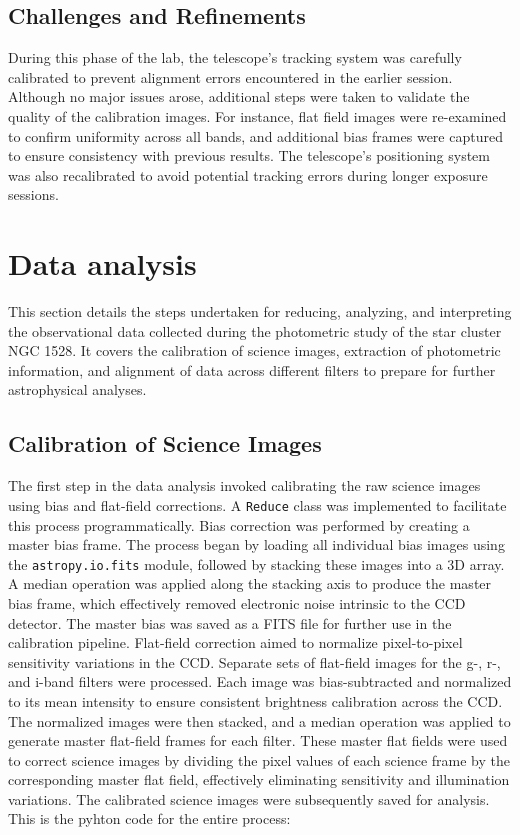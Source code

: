 \documentclass[linenumbers,twocolumn]{aastex631}
\begin{document}
\subsection{Challenges and Refinements}

During this phase of the lab, the telescope's tracking system was carefully calibrated to prevent alignment errors encountered in the earlier session. Although no major issues arose, additional steps were taken to validate the quality of the calibration images. For instance, flat field images were re-examined to confirm uniformity across all bands, and additional bias frames were captured to ensure consistency with previous results. The telescope’s positioning system was also recalibrated to avoid potential tracking errors during longer exposure sessions.

\section{Data analysis} \label{sec:results}

This section details the steps undertaken for reducing, analyzing, and interpreting the observational data collected during the photometric study of the star cluster NGC 1528. It covers the calibration of science images, extraction of photometric information, and alignment of data across different filters to prepare for further astrophysical analyses.

\subsection{Calibration of Science Images}

The first step in the data analysis invoked calibrating the raw science images using bias and flat-field corrections. A \texttt{Reduce} class was implemented to facilitate this process programmatically. Bias correction was performed by creating a master bias frame. The process began by loading all individual bias images using the \texttt{astropy.io.fits} module, followed by stacking these images into a 3D array. A median operation was applied along the stacking axis to produce the master bias frame, which effectively removed electronic noise intrinsic to the CCD detector. The master bias was saved as a FITS file for further use in the calibration pipeline. Flat-field correction aimed to normalize pixel-to-pixel sensitivity variations in the CCD. Separate sets of flat-field images for the g-, r-, and i-band filters were processed. Each image was bias-subtracted and normalized to its mean intensity to ensure consistent brightness calibration across the CCD. The normalized images were then stacked, and a median operation was applied to generate master flat-field frames for each filter. These master flat fields were used to correct science images by dividing the pixel values of each science frame by the corresponding master flat field, effectively eliminating sensitivity and illumination variations. The calibrated science images were subsequently saved for analysis. This is the pyhton code for the entire process: \\\\
\end{document}
